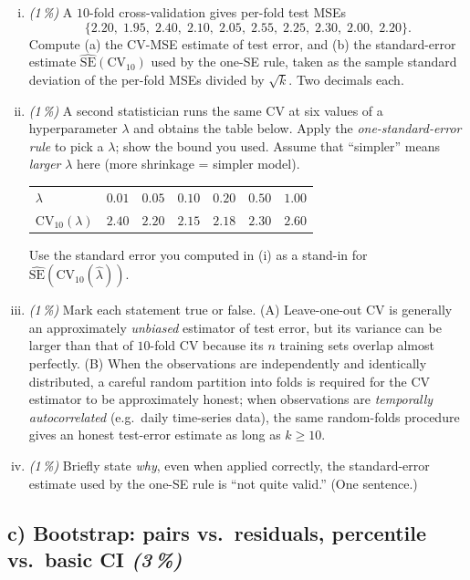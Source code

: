 \documentclass[11pt,a4paper]{article}
\newcommand{\subpoints}[1]{\textit{(#1\,\%)}}
\begin{document}
\begin{enumerate}[(i)]
  \item \subpoints{1} A $10$-fold cross-validation gives per-fold test MSEs
  $$\{2.20,\; 1.95,\; 2.40,\; 2.10,\; 2.05,\; 2.55,\; 2.25,\; 2.30,\; 2.00,\; 2.20\}.$$
  Compute (a) the CV-MSE estimate of test error, and (b) the standard-error estimate $\widehat{\mathrm{SE}}(\mathrm{CV}_{10})$ used by the one-SE rule, taken as the sample standard deviation of the per-fold MSEs divided by $\sqrt{k}$. Two decimals each.
  \item \subpoints{1} A second statistician runs the same CV at six values of a hyperparameter $\lambda$ and obtains the table below. Apply the \emph{one-standard-error rule} to pick a $\lambda$; show the bound you used. Assume that ``simpler'' means \emph{larger} $\lambda$ here (more shrinkage = simpler model).
  \begin{center}\small
  \begin{tabular}{lcccccc}
  \toprule
  $\lambda$       & $0.01$ & $0.05$ & $0.10$ & $0.20$ & $0.50$ & $1.00$ \\
  $\mathrm{CV}_{10}(\lambda)$ & $2.40$ & $2.20$ & $2.15$ & $2.18$ & $2.30$ & $2.60$ \\
  \bottomrule
  \end{tabular}
  \end{center}
  Use the standard error you computed in (i) as a stand-in for $\widehat{\mathrm{SE}}(\mathrm{CV}_{10}(\hat\lambda))$.
  \item \subpoints{1} Mark each statement true or false. (A) Leave-one-out CV is generally an approximately \emph{unbiased} estimator of test error, but its variance can be larger than that of $10$-fold CV because its $n$ training sets overlap almost perfectly. (B) When the observations are independently and identically distributed, a careful random partition into folds is required for the CV estimator to be approximately honest; when observations are \emph{temporally autocorrelated} (e.g.\ daily time-series data), the same random-folds procedure gives an honest test-error estimate as long as $k \geq 10$.
  \item \subpoints{1} Briefly state \emph{why}, even when applied correctly, the standard-error estimate used by the one-SE rule is ``not quite valid.'' (One sentence.)
\end{enumerate}

\subsection*{c) Bootstrap: pairs vs.\ residuals, percentile vs.\ basic CI \subpoints{3}}
\end{document}
